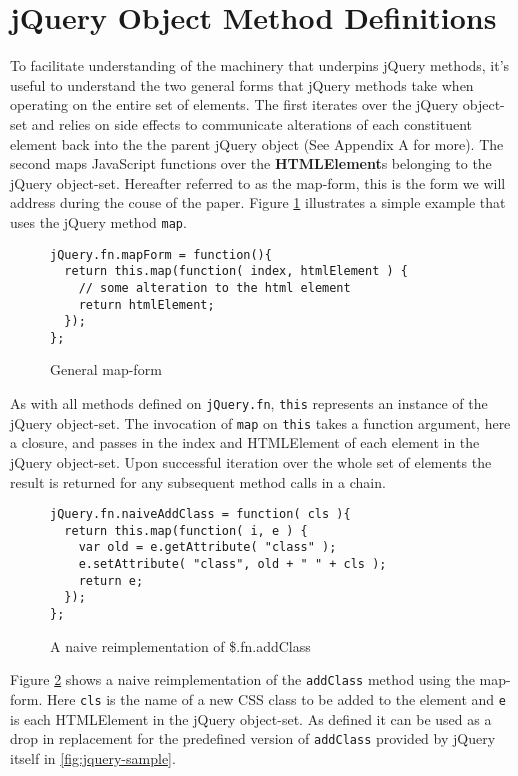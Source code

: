 \documentclass[preprint]{sigplanconf}
\begin{document}
\section{jQuery Object Method Definitions}

To facilitate understanding of the machinery that underpins jQuery methods, it's useful to understand the two general forms that jQuery methods take when operating on the entire set of elements. The first iterates over the jQuery object-set and relies on side effects to communicate alterations of each constituent element back into the the parent jQuery object (See Appendix A for more). The second maps JavaScript functions over the \textbf{HTMLElement}s belonging to the jQuery object-set. Hereafter referred to as the map-form, this is the form we will address during the couse of the paper. Figure \ref{fig:map-form} illustrates a simple example that uses the jQuery method \verb|map|.

\begin{figure}[!ht]
\small
\begin{verbatim}
jQuery.fn.mapForm = function(){
  return this.map(function( index, htmlElement ) {
    // some alteration to the html element
    return htmlElement;
  });
};
\end{verbatim}
\nocaptionrule \caption{General map-form}
\label{fig:map-form}
\end{figure}

As with all methods defined on \verb|jQuery.fn|, \verb|this| represents an instance of the jQuery object-set. The invocation of \verb|map| on \verb|this| takes a function argument, here a closure, and passes in the index and HTMLElement of each element in the jQuery object-set. Upon successful iteration over the whole set of elements the result is returned for any subsequent method calls in a chain.

\begin{figure}[!ht]
\small
\begin{verbatim}
jQuery.fn.naiveAddClass = function( cls ){
  return this.map(function( i, e ) {
    var old = e.getAttribute( "class" );
    e.setAttribute( "class", old + " " + cls );
    return e;
  });
};
\end{verbatim}
\nocaptionrule \caption{A naive reimplementation of \$.fn.addClass}
\label{fig:naive-add-class}
\end{figure}

Figure \ref{fig:naive-add-class} shows a naive reimplementation of the \verb|addClass| method using the map-form. Here \verb|cls| is the name of a new CSS class to be added to the element and \verb|e| is each HTMLElement in the jQuery object-set. As defined it can be used as a drop in replacement for the predefined version of \verb|addClass| provided by jQuery itself in \ref{fig:jquery-sample}.
\end{document}
